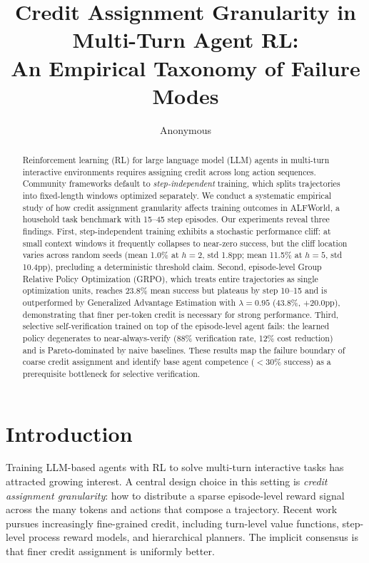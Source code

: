 \documentclass[11pt]{article}
\title{Credit Assignment Granularity in Multi-Turn Agent RL:\\An Empirical Taxonomy of Failure Modes}
\author{Anonymous}
\date{}
\begin{document}
\maketitle

\begin{abstract}
Reinforcement learning (RL) for large language model (LLM) agents in multi-turn interactive environments requires assigning credit across long action sequences.
Community frameworks default to \emph{step-independent} training, which splits trajectories into fixed-length windows optimized separately.
We conduct a systematic empirical study of how credit assignment granularity affects training outcomes in ALFWorld, a household task benchmark with 15--45 step episodes.
Our experiments reveal three findings.
First, step-independent training exhibits a stochastic performance cliff: at small context windows it frequently collapses to near-zero success, but the cliff location varies across random seeds (mean 1.0\% at $h{=}2$, std 1.8pp; mean 11.5\% at $h{=}5$, std 10.4pp), precluding a deterministic threshold claim.
Second, episode-level Group Relative Policy Optimization (GRPO), which treats entire trajectories as single optimization units, reaches 23.8\% mean success but plateaus by step 10--15 and is outperformed by Generalized Advantage Estimation with $\lambda{=}0.95$ (43.8\%, $+$20.0pp), demonstrating that finer per-token credit is necessary for strong performance.
Third, selective self-verification trained on top of the episode-level agent fails: the learned policy degenerates to near-always-verify (88\% verification rate, 12\% cost reduction) and is Pareto-dominated by naive baselines.
These results map the failure boundary of coarse credit assignment and identify base agent competence ($<$30\% success) as a prerequisite bottleneck for selective verification.
\end{abstract}

\section{Introduction}

Training LLM-based agents with RL to solve multi-turn interactive tasks has attracted growing interest.
A central design choice in this setting is \emph{credit assignment granularity}: how to distribute a sparse episode-level reward signal across the many tokens and actions that compose a trajectory.
Recent work pursues increasingly fine-grained credit, including turn-level value functions, step-level process reward models, and hierarchical planners.
The implicit consensus is that finer credit assignment is uniformly better.
\end{document}
